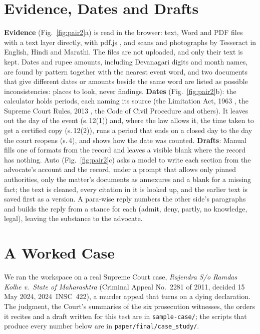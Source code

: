 

\section{Evidence, Dates and Drafts}
\label{sec:evidence}
\textbf{Evidence} (Fig.~\ref{fig:pair2}a) is read in the browser: text, Word and PDF files with a text layer directly, with pdf.js \cite{pdfjs}, and scans and photographs by Tesseract \cite{smith2007} in English, Hindi and Marathi. The files are not uploaded, and only their text is kept. Dates and rupee amounts, including Devanagari digits and month names, are found by pattern together with the nearest event word, and two documents that give different dates or amounts beside the same word are listed as possible inconsistencies: places to look, never findings. \textbf{Dates} (Fig.~\ref{fig:pair2}b): the calculator holds \CasePeriods{} periods, each naming its source (the Limitation Act, 1963 \cite{limitationact}, the Supreme Court Rules, 2013 \cite{scrules}, the Code of Civil Procedure and others). It leaves out the day of the event (s.\,12(1)) and, where the law allows it, the time taken to get a certified copy (s.\,12(2)), runs a period that ends on a closed day to the day the court reopens (s.\,4), and shows how the date was counted. \textbf{Drafts}: Manual fills one of \CaseFormats{} formats from the record and leaves a visible blank where the record has nothing. Auto (Fig.~\ref{fig:pair2}c) asks a model to write each section from the advocate's account and the record, under a prompt that allows only pinned authorities, only the matter's documents as annexures and a blank for a missing fact; the text is cleaned, every citation in it is looked up, and the earlier text is saved first as a version. A para-wise reply numbers the other side's paragraphs and builds the reply from a stance for each (admit, deny, partly, no knowledge, legal), leaving the substance to the advocate.



\section{A Worked Case}
\label{sec:case}
We ran the workspace on a real Supreme Court case, \emph{Rajendra S/o Ramdas Kolhe v.\ State of Maharashtra} (Criminal Appeal No.~2281 of 2011, decided 15 May 2024, 2024~INSC~422), a murder appeal that turns on a dying declaration. The judgment, the Court's summaries of the six prosecution witnesses, the orders it recites and a draft written for this test are in \texttt{sample-case/}; the scripts that produce every number below are in \texttt{paper/final/case\_study/}.

